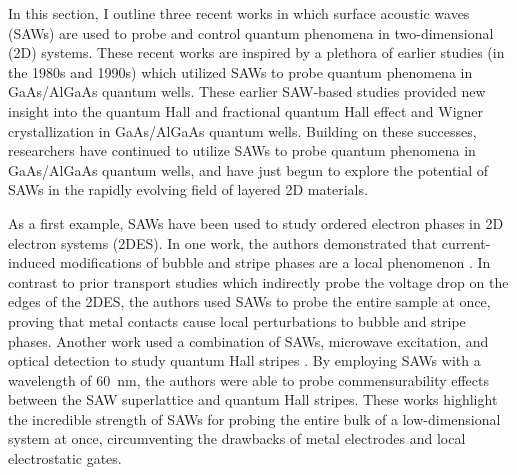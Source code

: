 \documentclass{beavtex_dub_edit}
\begin{document}
In this section, I outline three recent works in which surface acoustic waves (SAWs) are used to probe and control quantum phenomena in two-dimensional (2D) systems. These recent works are inspired by a plethora of earlier studies (in the 1980s and 1990s) which utilized SAWs to probe quantum phenomena in GaAs/AlGaAs quantum wells. These earlier SAW-based studies provided new insight into the quantum Hall and fractional quantum Hall effect \cite{wixforth_quantum_1986,esslinger_acoustoelectric_1992,esslinger_ultrasonic_1994,kukushkin_collective_2011,willett_experimental_1993} and Wigner crystallization \cite{paalanen_rf_1992} in GaAs/AlGaAs quantum wells. Building on these successes, researchers have continued to utilize SAWs to probe quantum phenomena in GaAs/AlGaAs quantum wells, and have just begun to explore the potential of SAWs in the rapidly evolving field of layered 2D materials.

As a first example, SAWs have been used to study ordered electron phases in 2D electron systems (2DES). In one work, the authors demonstrated that current-induced modifications of bubble and stripe phases are a local phenomenon \cite{friess_current_2018}. In contrast to prior transport studies which indirectly probe the voltage drop on the edges of the 2DES, the authors used SAWs to probe the entire sample at once, proving that metal contacts cause local perturbations to bubble and stripe phases. Another work used a combination of SAWs, microwave excitation, and optical detection to study quantum Hall stripes \cite{kukushkin_collective_2011}. By employing SAWs with a wavelength of \SI{60}{\nano\meter}, the authors were able to probe commensurability effects between the SAW superlattice and quantum Hall stripes. These works highlight the incredible strength of SAWs for probing the entire bulk of a low-dimensional system at once, circumventing the drawbacks of metal electrodes and local electrostatic gates. 
\end{document}
